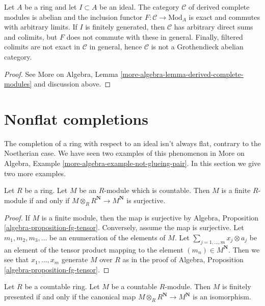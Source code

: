 \begin{lemma}
\label{lemma-derived-complete-modules}
Let $A$ be a ring and let $I \subset A$ be an ideal.
The category $\mathcal{C}$ of derived complete modules
is abelian and the inclusion functor $F : \mathcal{C} \to \text{Mod}_A$
is exact and commutes with arbitrary limits.
If $I$ is finitely generated, then $\mathcal{C}$ has
arbitrary direct sums and colimits, but $F$ does not commute with these
in general. Finally, filtered colimits are not exact in $\mathcal{C}$
in general, hence $\mathcal{C}$ is not a Grothendieck abelian category.
\end{lemma}

\begin{proof}
See More on Algebra, Lemma \ref{more-algebra-lemma-derived-complete-modules}
and discussion above.
\end{proof}





\section{Nonflat completions}
\label{section-nonflat}

\noindent
The completion of a ring with respect to an ideal isn't always flat,
contrary to the Noetherian case. We have seen two examples of this
phenomenon in
More on Algebra, Example \ref{more-algebra-example-not-glueing-pair}.
In this section we give two more examples.

\begin{lemma}
\label{lemma-countable-fg-tensor}
Let $R$ be a ring. Let $M$ be an $R$-module which is countable.
Then $M$ is a finite $R$-module if and only if
$M \otimes_R R^\mathbf{N} \to M^\mathbf{N}$ is surjective.
\end{lemma}

\begin{proof}
If $M$ is a finite module, then the map is surjective by Algebra, Proposition
\ref{algebra-proposition-fg-tensor}. Conversely, assume the map is surjective.
Let $m_1, m_2, m_3, \ldots$ be an enumeration of the elements of $M$.
Let $\sum_{j = 1, \ldots, m} x_j \otimes a_j$ be an element of the
tensor product mapping to the element $(m_n) \in M^\mathbf{N}$. Then
we see that $x_1, \ldots, x_m$ generate $M$ over $R$ as in the proof of
Algebra, Proposition \ref{algebra-proposition-fg-tensor}.
\end{proof}

\begin{lemma}
\label{lemma-countable-fp-tensor}
Let $R$ be a countable ring. Let $M$ be a countable $R$-module. Then $M$
is finitely presented if and only if the canonical map
$M \otimes_R R^\mathbf{N} \to M^\mathbf{N}$ is an isomorphism.
\end{lemma}

